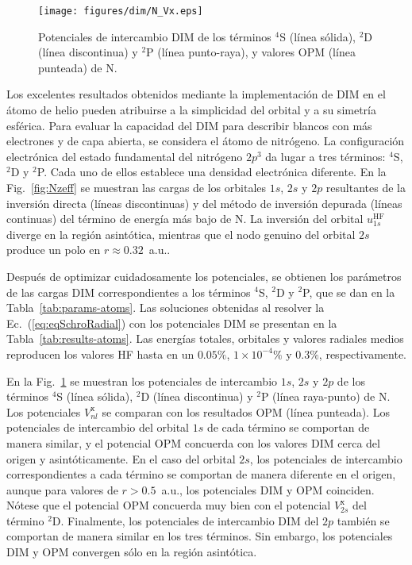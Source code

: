 \begin{figure}[t]
\centering
\texttt{[image: figures/dim/N\_Vx.eps]}
\caption[Potenciales de intercambio DIM de N.]
{Potenciales de intercambio DIM de los términos $^4$S (línea sólida), 
$^2$D (línea discontinua) y $^2$P (línea punto-raya), y valores OPM 
(línea punteada) de N.}
\label{fig:NVx}
\end{figure}

Los excelentes resultados obtenidos mediante la implementación de DIM en 
el átomo de helio pueden atribuirse a la simplicidad del orbital y a 
su simetría esférica. Para evaluar la capacidad del DIM para describir 
blancos con más electrones y de capa abierta, se considera el átomo de 
nitrógeno. La configuración electrónica del estado fundamental del 
nitrógeno $2p^3$ da lugar a tres términos: $^4$S, $^2$D y $^2$P. Cada 
uno de ellos establece una densidad electrónica diferente. En la 
Fig.~\ref{fig:Nzeff} se muestran las cargas de los orbitales $1s$, $2s$ 
y $2p$ resultantes de la inversión directa (líneas discontinuas) y del 
método de inversión depurada (líneas continuas) del término de energía 
más bajo de N. La inversión del orbital $u_{1s}^{\mathrm{HF}}$ diverge 
en la región asintótica, mientras que el nodo genuino del orbital $2s$
produce un polo en $r\approx 0.32$~a.u..

Después de optimizar cuidadosamente los potenciales, se obtienen los 
parámetros de las cargas DIM correspondientes a los términos $^4$S, 
$^2$D y $^2$P, que se dan en la Tabla~\ref{tab:params-atoms}. Las 
soluciones obtenidas al resolver la Ec.~(\ref{eq:eqSchroRadial}) con los 
potenciales DIM se presentan en la Tabla~\ref{tab:results-atoms}. Las 
energías totales, orbitales y valores radiales medios reproducen los 
valores HF hasta en un $0.05\%$, $1\times 10^{-4}\%$ y $0.3\%$, 
respectivamente. 

En la Fig.~\ref{fig:NVx} se muestran los potenciales de intercambio 
$1s$, $2s$ y $2p$ de los términos $^4$S (línea sólida), $^2$D (línea 
discontinua) y $^2$P (línea raya-punto) de N. Los potenciales 
$V_{nl}^{\mathrm{x}}$ se comparan con los resultados OPM (línea 
punteada). Los potenciales de intercambio del orbital $1s$ de cada 
término se comportan de manera similar, y el potencial OPM concuerda con 
los valores DIM cerca del origen y asintóticamente. En el caso del 
orbital $2s$, los potenciales de intercambio correspondientes a cada 
término se comportan de manera diferente en el origen, aunque para 
valores de $r>0.5$~a.u., los potenciales DIM y OPM coinciden. Nótese que 
el potencial OPM concuerda muy bien con el potencial $V_{2s}^{\mathrm{x}}$ 
del término $^2$D. Finalmente, los potenciales de intercambio DIM del 
$2p$ también se comportan de manera similar en los tres términos. Sin 
embargo, los potenciales DIM y OPM convergen sólo en la región 
asintótica. 

